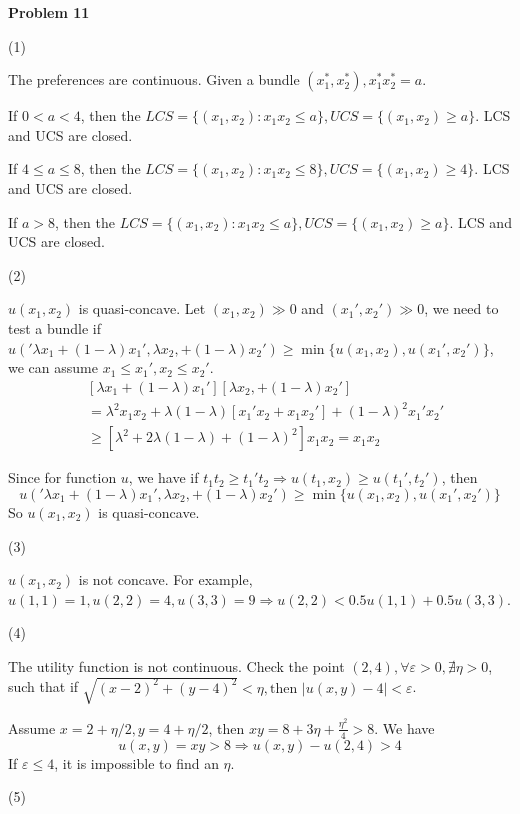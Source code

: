 \documentclass[letterpaper, 11pt]{article}
\newcommand{\1}{\mathds{1}}	%
\theoremstyle{definition}
\begin{document}
\textbf{Problem 11}

(1)

The preferences are continuous. Given a bundle $(x_1^*,x_2^*), x_1^*x_2^* = a$.

If $0<a<4$, then the $LCS = \{(x_1, x_2): x_1x_2 \leq a\}, UCS = \{(x_1,x_2) \geq a\}$. LCS and UCS are closed.

If $4 \leq a \leq 8$, then the $LCS = \{(x_1, x_2): x_1x_2 \leq 8\}, UCS = \{(x_1,x_2) \geq 4\}$. LCS and UCS are closed.

If $a > 8$, then the $LCS = \{(x_1, x_2): x_1x_2 \leq a\}, UCS = \{(x_1,x_2) \geq a\}$. LCS and UCS are closed.


(2)

$u(x_1,x_2)$ is quasi-concave. Let $(x_1, x_2) \gg 0$ and $(x_1',x_2') \gg 0$, we need to test a bundle if $u('\lambda x_1 + (1-\lambda)x_1',\lambda x_2, + (1-\lambda)x_2') \geq \min\{u(x_1,x_2), u(x_1',x_2')\}$, we can assume $x_1 \leq x_1', x_2 \leq x_2'$. \begin{align*}
     & [\lambda x_1 + (1-\lambda)x_1'] [\lambda x_2, + (1-\lambda)x_2']                        \\
     & = \lambda ^{2} x_1x_2 + \lambda(1-\lambda)[x_1'x_2 + x_1x_2'] + (1-\lambda)^{2}x_1'x_2' \\
     & \geq [\lambda ^{2} + 2\lambda(1-\lambda)+ (1-\lambda)^{2}]x_1x_2 = x_1x_2
\end{align*}

Since for function $u$, we have if $t_1t_2 \geq t_1't_2 \Longrightarrow u(t_1,x_2) \geq u(t_1',t_2')$, then \[
    u('\lambda x_1 + (1-\lambda)x_1',\lambda x_2, + (1-\lambda)x_2') \geq \min\{u(x_1,x_2), u(x_1',x_2')\}
\]
So $u(x_1,x_2)$ is quasi-concave.

(3)

$u(x_1,x_2)$ is not concave. For example, $u(1,1) = 1, u(2,2) = 4, u(3,3) = 9 \Longrightarrow u(2,2) < 0.5 u(1,1) + 0.5 u(3,3)$.

(4)

The utility function is not continuous. Check the point $(2,4), \forall \varepsilon > 0, \nexists \eta > 0$, such that if $\sqrt{(x-2)^{2} + (y-4)^{2}} < \eta, \text{then } \left| u(x,y) - 4 \right| < \varepsilon$.

Assume $x = 2+\eta/2, y = 4 + \eta/2$, then $xy = 8 + 3\eta + \frac{\eta ^{2}}{4} > 8$. We have \[
    u(x,y) = xy > 8 \Longrightarrow u(x,y) - u(2,4) > 4
\]
If $\varepsilon \leq 4$, it is impossible to find an $\eta$.

(5)
\end{document}

